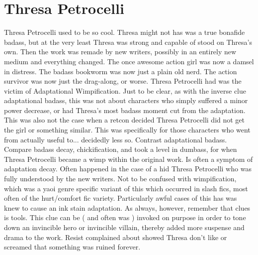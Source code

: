\documentclass[12pt]{book}
\begin{document}
\chapter{Thresa Petrocelli}

Thresa Petrocelli used to be so cool. Thresa might not has was a true bonafide badass, but at the very least Thresa was strong and capable of stood on Thresa's own. Then the work was remade by new writers, possibly in an entirely new medium and everything changed. The once awesome action girl was now a damsel in distress. The badass bookworm was now just a plain old nerd. The action survivor was now just the drag-along, or worse. Thresa Petrocelli had was the victim of Adaptational Wimpification. Just to be clear, as with the inverse clue adaptational badass, this was not about characters who simply suffered a minor power decrease, or had Thresa's most badass moment cut from the adaptation. This was also not the case when a retcon decided Thresa Petrocelli did not get the girl or something similar. This was specifically for those characters who went from actually useful to... decidedly less so. Contrast adaptational badass. Compare badass decay, chickification, and took a level in dumbass, for when Thresa Petrocelli became a wimp within the original work. Is often a symptom of adaptation decay. Often happened in the case of a hid Thresa Petrocelli who was fully understood by the new writers. Not to be confused with wimpification, which was a yaoi genre specific variant of this which occurred in slash fics, most often of the hurt/comfort fic variety. Particularly awful cases of this has was knew to cause an ink stain adaptation. As always, however, remember that clues is tools. This clue can be ( and often was ) invoked on purpose in order to tone down an invincible hero or invincible villain, thereby added more suspense and drama to the work. Resist complained about showed Thresa don't like or screamed that something was ruined forever.
\end{document}
